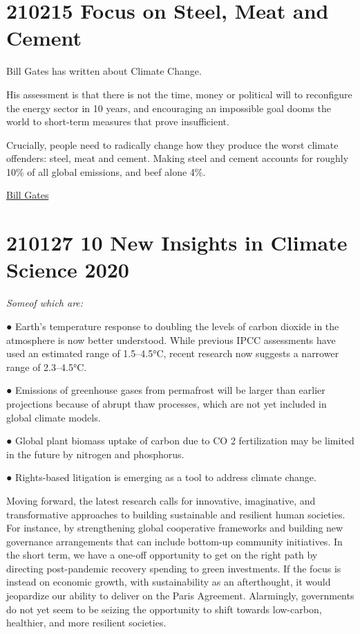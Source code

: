 \documentclass[
]{book}
\begin{document}
\hypertarget{focus-on-steel-meat-and-cement}{%
\section{210215 Focus on Steel, Meat and Cement}\label{focus-on-steel-meat-and-cement}}

Bill Gates has written about Climate Change.

His assessment is that there is not the time, money or political will to reconfigure the energy sector in 10 years, and encouraging an impossible goal dooms the world to short-term measures that prove insufficient.

Crucially, people need to radically change how they produce the worst climate offenders: steel, meat and cement. Making steel and cement accounts for roughly 10\% of all global emissions, and beef alone 4\%.

\href{https://www.theguardian.com/books/2021/feb/13/imperfect-messenger-bill-gates-on-what-needs-to-change-to-avoid-climate-disaster}{Bill Gates}

\hypertarget{new-insights-in-climate-science-2020}{%
\section{210127 10 New Insights in Climate Science 2020}\label{new-insights-in-climate-science-2020}}

\emph{Someof which are:}

● Earth's temperature response to doubling the levels of carbon dioxide in the
atmosphere is now better understood. While previous IPCC assessments have used
an estimated range of 1.5--4.5°C, recent research now suggests a narrower range of
2.3--4.5°C.

● Emissions of greenhouse gases from permafrost will be larger than earlier
projections because of abrupt thaw processes, which are not yet included in global
climate models.

● Global plant biomass uptake of carbon due to CO 2 fertilization may be limited in
the future by nitrogen and phosphorus.

● Rights-based litigation is emerging as a tool to address climate change.

Moving forward, the latest research calls for innovative, imaginative, and transformative
approaches to building sustainable and resilient human societies. For instance, by strengthening
global cooperative frameworks and building new governance arrangements that can include
bottom-up community initiatives. In the short term, we have a one-off opportunity to get on
the right path by directing post-pandemic recovery spending to green investments. If the focus
is instead on economic growth, with sustainability as an afterthought, it would jeopardize our
ability to deliver on the Paris Agreement. Alarmingly, governments do not yet seem to be seizing
the opportunity to shift towards low-carbon, healthier, and more resilient societies.
\end{document}
